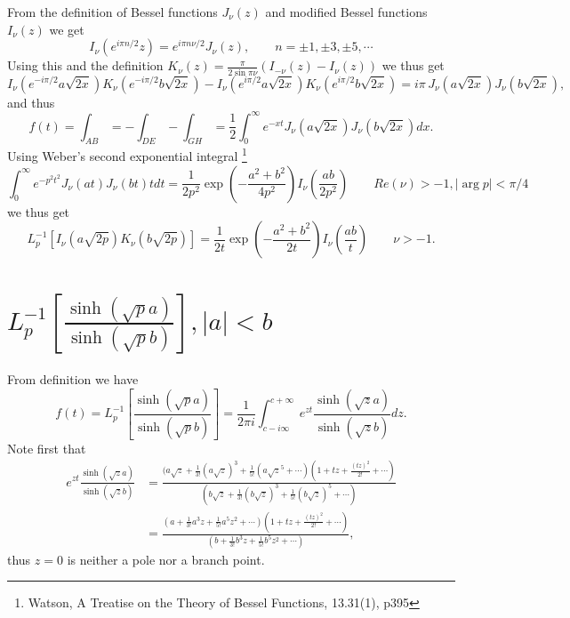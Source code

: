 From the definition of Bessel functions $J_{\nu}(z)$ and modified Bessel
functions $I_{\nu}(z)$ we get
\[
  I_{\nu}(e^{i\pi n/2} z) = e^{i\pi n\nu/2} J_{\nu}(z),
    \qquad n=\pm 1,\pm 3, \pm 5,\cdots
\]
Using this and the definition
$K_{\nu}(z)=\frac{\pi}{2\sin\pi\nu}(I_{-\nu}(z)-I_{\nu}(z))$ we thus get
\[
  I_{\nu}(e^{-i\pi/2} a\sqrt{2x}) K_{\nu}(e^{-i\pi/2} b\sqrt{2x}) 
    - I_{\nu}(e^{i\pi/2} a\sqrt{2x}) K_{\nu}(e^{i\pi/2} b\sqrt{2x}) 
  = i \pi \, J_{\nu}(a\sqrt{2x}) J_{\nu}(b\sqrt{2x}),
\]
and thus
\[
  f(t)= \int_{AB} = - \int_{DE} - \int_{GH} = \frac{1}{2} 
    \int_0^{\infty} e^{-xt} J_{\nu}(a\sqrt{2x}) J_{\nu}(b\sqrt{2x}) dx.
\]
Using Weber's second exponential integral
\footnote{Watson, A Treatise on the Theory of Bessel Functions, 13.31(1), p395}
\[
  \int_0^{\infty} e^{-p^2 t^2} J_{\nu}(at) J_{\nu}(bt)tdt
    = \frac{1}{2p^2} \exp\left( -\frac{a^2+b^2}{4p^2} \right)
      I_{\nu}\left( \frac{ab}{2p^2} \right)
      \qquad Re(\nu)>-1, |\arg p|<\pi/4
\]
we thus get
\begin{equation} \label{E:ilt6}
  L_p^{-1} \left[ I_{\nu}(a\sqrt{2p}) K_{\nu}(b\sqrt{2p}) \right]
    = \frac{1}{2t} \exp\left( -\frac{a^2+b^2}{2t} \right)
      I_{\nu} \left( \frac{ab}{t} \right) \qquad \nu>-1.
\end{equation}

\section{$L_p^{-1}[ \frac{\sinh (\sqrt{p} a)}{\sinh (\sqrt{p} b)} ], |a|<b$ }
From definition we have
\[
  f(t)= L_p^{-1}\left[ \frac{\sinh (\sqrt{p} a)}{\sinh (\sqrt{p} b)} \right]
	    = \frac{1}{2\pi i} 
			  \int_{c-i\infty}^{c+\infty} 
		      e^{zt} \frac{\sinh (\sqrt{z} a)}{\sinh (\sqrt{z} b)} dz.
\]
Note first that
\begin{align*}
  e^{zt} \frac{\sinh (\sqrt{z} a)}{\sinh (\sqrt{z} b)} 
	&= \frac{ ( a\sqrt{z} + \frac{1}{3!} (a\sqrt{z})^3 
	            + \frac{1}{5!} (a\sqrt{z}^5 + \cdots )
							(1 + tz + \frac{(tz)^2}{2!} + \cdots) }
          { ( b\sqrt{z} + \frac{1}{3!} (b\sqrt{z})^3 
					    + \frac{1}{5!} (b\sqrt{z})^5 + \cdots ) } \\
	&= \frac{ (a + \frac{1}{3!} a^3 z + \frac{1}{5!} a^5 z^2 + \cdots)
            (1 + tz + \frac{(tz)^2}{2!} + \cdots) }
						{ (b + \frac{1}{3!} b^3 z + \frac{1}{5!} b^5 z^2 + \cdots) }, 
\end{align*}
thus $z=0$ is neither a pole nor a branch point.

